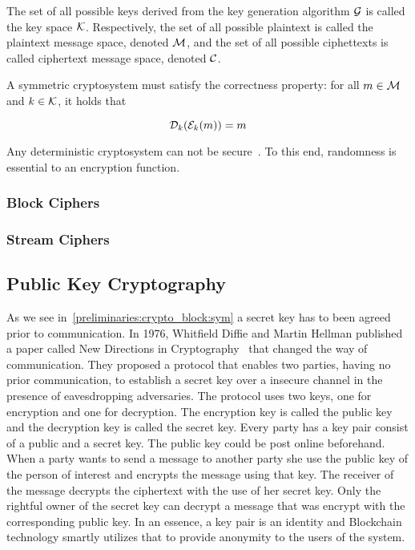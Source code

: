 The set of all possible keys derived from the key generation algorithm $\mathcal{G}$ is called the key space $\mathcal{K}$. Respectively, the set of all possible plaintext is called the plaintext message space, denoted $\mathcal{M}$, and the set of all possible ciphettexts is called ciphertext message space, denoted $\mathcal{C}$.

A symmetric cryptosystem must satisfy the correctness property: for all $m \in \mathcal{M}$ and $k \in \mathcal{K}$, it holds that

\begin{equation*}
  \mathcal{D}_{k}(\mathcal{E}_{k}(m)) = m
\end{equation*}

Any deterministic cryptosystem can not be secure~\cite{Katz:2014:IMC:2700550, kiagias:crypto}. To this end, randomness is essential to an encryption function.

\subsubsection{Block Ciphers}
\label{preliminaries:crypto_block:sym:block}

\subsubsection{Stream Ciphers}
\label{preliminaries:crypto_block:sym:stream}

\subsection{Public Key Cryptography}
\label{preliminaries:crypto_block:pub}

As we see in~\ref{preliminaries:crypto_block:sym} a secret key has to been agreed prior to communication. In 1976, Whitfield Diffie and Martin Hellman published a paper called New Directions in Cryptography~\cite{Diffie:2006:NDC:2263321.2269104} that changed the way of communication. They proposed a protocol that enables two parties, having no prior communication, to establish a secret key over a insecure channel in the presence of eavesdropping adversaries. The protocol uses two keys, one for encryption and one for decryption. The encryption key is called the public key and the decryption key is called the secret key. Every party has a key pair consist of a public and a secret key. The public key could be post online beforehand. When a party wants to send a message to another party she use the public key of the person of interest and encrypts the message using that key. The receiver of the message decrypts the ciphertext with the use of her secret key. Only the rightful owner of the secret key can decrypt a message that was encrypt with the corresponding public key. In an essence, a key pair is an identity and Blockchain technology smartly utilizes that to provide anonymity to the users of the system.

